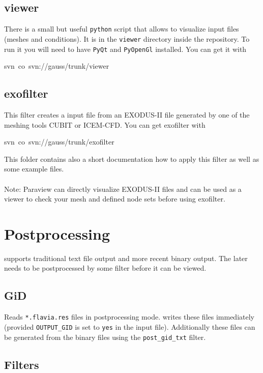 \subsection{viewer}

There is a small but useful \texttt{python} script that allows to
visualize \ccarat{} input files (meshes and conditions). It is in
the \texttt{viewer} directory inside the repository. To run it you
will need to have \texttt{PyQt} and \texttt{PyOpenGl} installed. You
can get it with

\begin{lyxcode}
svn~co~svn://gauss/trunk/viewer
\end{lyxcode}

\subsection{exofilter}
This filter creates a \ccarat{} input file from an EXODUS-II file
generated by one of the meshing tools CUBIT or ICEM-CFD.
You can get exofilter with
\begin{lyxcode}
svn~co~svn://gauss/trunk/exofilter
\end{lyxcode}
This folder contains also a short documentation how to apply this filter
as well as some example files.\\
\\
Note: Paraview can directly visualize EXODUS-II files and can be used
as a viewer to check your mesh and defined node sets before using exofilter.


\section{Postprocessing}

\ccarat{} supports traditional text file output and more recent binary
output. The later needs to be postprocessed by some filter before
it can be viewed.


\subsection{GiD}

Reads \texttt{{*}.flavia.res} files in postprocessing mode. \ccarat{}
writes these files immediately (provided \texttt{OUTPUT\_GID} is set
to \texttt{yes} in the input file). Additionally these files can be
generated from the binary files using the \texttt{post\_gid\_txt}
filter.


\subsection{Filters}

